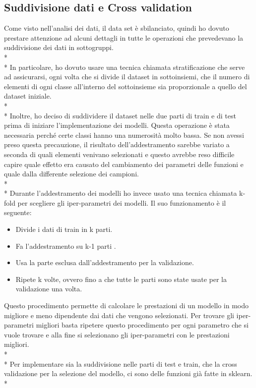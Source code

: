 \subsection{Suddivisione dati e Cross validation}\label{SudCros}
\normalsize
Come visto nell’analisi dei dati, il data set è sbilanciato, quindi ho dovuto prestare attenzione ad alcuni dettagli in tutte le operazioni che prevedevano la suddivisione dei dati in sottogruppi.\\*\\*
In particolare, ho dovuto usare una tecnica chiamata stratificazione che serve ad assicurarsi, ogni volta che si divide il dataset in sottoinsiemi, che il numero di elementi di ogni classe all'interno del sottoinsieme sia proporzionale a quello del dataset iniziale. \\*\\*
Inoltre, ho deciso di suddividere il dataset nelle due parti di train e di test prima di iniziare l'implementazione dei modelli. Questa operazione è stata necessaria perché certe classi hanno una numerosità molto bassa.
Se non avessi preso questa precauzione, il risultato dell'addestramento sarebbe variato a seconda di quali elementi venivano selezionati e questo avrebbe reso difficile capire quale effetto era causato del cambiamento dei parametri delle funzioni e quale dalla differente selezione dei campioni.\\*\\*
Durante l'addestramento dei modelli ho invece usato una tecnica chiamata k-fold per scegliere gli iper-parametri dei modelli. Il suo funzionamento è il seguente:
\begin{itemize}
	\item Divide i dati di train in k parti.
	\item Fa l'addestramento su k-1 parti .
	\item Usa la parte esclusa dall'addestramento per la validazione.
	\item Ripete k volte, ovvero fino a che tutte le parti sono state usate per la validazione una volta.
\end{itemize}
Questo procedimento permette di calcolare le prestazioni di un modello in modo migliore e meno dipendente dai dati che vengono selezionati. Per trovare gli iper-parametri migliori basta ripetere questo procedimento per ogni parametro che si vuole trovare e alla fine si selezionano gli iper-parametri con le prestazioni migliori.\\*\\*
Per implementare sia la suddivisione nelle parti di test e train, che la cross validazione per la selezione del modello, ci sono delle funzioni già fatte in sklearn.\\*

